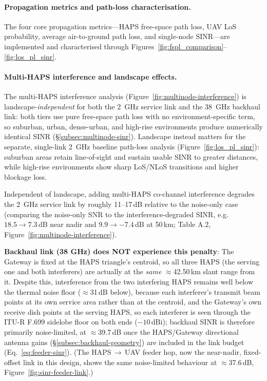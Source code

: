 \documentclass[conference]{IEEEtran}
\begin{document}
\paragraph{Propagation metrics and path-loss characterisation.}
The four core propagation metrics---HAPS free-space path loss, UAV LoS probability,
average air-to-ground path loss, and single-node SINR---are implemented and
characterised through Figures~\ref{fig:fspl_comparison}--\ref{fig:los_pl_sinr}.

\paragraph{Multi-HAPS interference and landscape effects.}
The multi-HAPS interference analysis (Figure~\ref{fig:multinode-interference}) is landscape-\emph{independent} for both the 2~GHz service link and the 38~GHz backhaul link: both tiers use pure free-space path loss with no environment-specific term, so suburban, urban, dense-urban, and high-rise environments produce numerically identical SINR (\S\ref{subsec:multinode-sinr}). Landscape instead matters for the separate, single-link 2~GHz baseline path-loss analysis (Figure~\ref{fig:los_pl_sinr}): suburban areas retain line-of-sight and sustain usable SINR to greater distances, while high-rise environments show sharp LoS/NLoS transitions and higher blockage loss.

Independent of landscape, adding multi-HAPS co-channel interference degrades the 2~GHz service link by roughly 11--17\,dB relative to the noise-only case (comparing the noise-only SNR to the interference-degraded SINR, e.g.\ $18.5\to7.3$\,dB near nadir and $9.9\to-7.4$\,dB at 50\,km; Table A.2, Figure~\ref{fig:multinode-interference}).

\noindent \textbf{Backhaul link (38 GHz) does NOT experience this penalty}: The Gateway is fixed at the HAPS triangle's centroid, so all three HAPS (the serving one and both interferers) are actually at the \emph{same} $\approx$42.50\,km slant range from it. Despite this, interference from the two interfering HAPS remains well below the thermal noise floor ($\approx$31\,dB below), because each interferer's transmit beam points at its own service area rather than at the centroid, and the Gateway's own receive dish points at the serving HAPS, so each interferer is seen through the ITU-R F.699 sidelobe floor on both ends ($-10$\,dBi); backhaul SINR is therefore primarily noise-limited, at $\approx$39.7\,dB once the HAPS/Gateway directional antenna gains (\S\ref{subsec:backhaul-geometry}) are included in the link budget (Eq.~\eqref{eq:feeder-sinr}). (The HAPS\,$\rightarrow$\,UAV feeder hop, now the near-nadir, fixed-offset link in this design, shows the same noise-limited behaviour at $\approx$37.6\,dB, Figure~\ref{fig:sinr-feeder-link}.)
\end{document}
